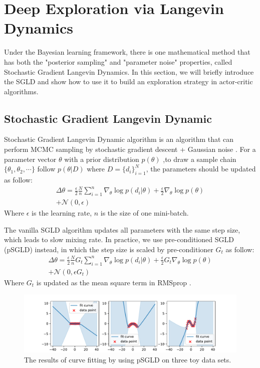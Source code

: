 \section{Deep Exploration via Langevin Dynamics}
Under the Bayesian learning framework, there is one mathematical method that has both the "posterior sampling" and "parameter noise" properties, called Stochastic Gradient Langevin Dynamics. In this section, we will briefly introduce the SGLD and show how to use it to build an exploration strategy in actor-critic algorithms.

\subsection{Stochastic Gradient Langevin Dynamic}
Stochastic Gradient Langevin Dynamic algorithm is an algorithm that can perform MCMC sampling by stochastic gradient descent + Gaussian noise \cite{SGLD}. For a parameter vector $\theta$ with a prior distribution $p(\theta)$ ,to draw a sample chain $\{\theta_1,\theta_2,\cdots\}$ follow $p(\theta|D)$ where $D=\{d_i\}^N_{i=1}$, the parameters should be updated as follow:
\begin{equation}
   \label{eq:sgld} 
   \begin{aligned}
\Delta\theta =\frac{\epsilon}{2}\frac{N}{n}\sum_{i=1}^{n}\nabla_\theta\log p(d_i|\theta)+\frac{\epsilon}{2}\nabla_\theta\log p(\theta)\\
+\mathcal{N}(0,\epsilon)
\end{aligned}
\end{equation}
Where $\epsilon$ is the learning rate, $n$ is the size of one mini-batch. 

The vanilla SGLD algorithm updates all parameters with the same step size, which leads to slow mixing rate. In practice, we use pre-conditioned SGLD (pSGLD) instead, in which the step size is scaled by pre-conditioner $G_t$ as follow:
\begin{equation}
   \label{eq:psgld} 
   \begin{aligned}
      \Delta\theta =\frac{\epsilon}{2}\frac{N}{n}G_t\sum_{i=1}^{n}\nabla_\theta\log p(d_i|\theta)+\frac{\epsilon}{2}G_t\nabla_\theta\log p(\theta)\\
      +\mathcal{N}(0,\epsilon G_t)
   \end{aligned}
\end{equation}
Where $G_t$ is updated as the mean square term in RMSprop \cite{rmsprop}.
\begin{figure}[htbp]
   \begin{center}
      \centerline{\includegraphics[width=400pt]{figs/three-curve}}
   \caption{The results of curve fitting by using pSGLD on three toy data sets.}
   \label{fig:three}
   \end{center}
\end{figure}

